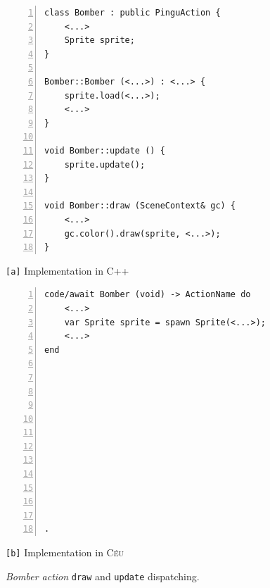 \documentclass{vgtc}                          %
\newcommand{\CEU}{\textsc{C\'{e}u}\xspace}
\newcommand{\code}[1] {{\small{\texttt{#1}}}}
\newcommand{\ax}{\code{[a]}\xspace}
\newcommand{\bx}{\code{[b]}\xspace}
\begin{document}
\begin{figure}[t]
\begin{minipage}[t]{0.50\linewidth}
\begin{lstlisting}[numbers=left,xleftmargin=3em]
class Bomber : public PinguAction {
    <...>
    Sprite sprite;
}

Bomber::Bomber (<...>) : <...> {
    sprite.load(<...>);
    <...>
}

void Bomber::update () {
    sprite.update();
}

void Bomber::draw (SceneContext& gc) {
    <...>
    gc.color().draw(sprite, <...>);
}
\end{lstlisting}
\centering\small{\ax Implementation in C++}
\end{minipage}
%
\begin{minipage}[t]{0.50\linewidth}
\begin{lstlisting}[numbers=left,xleftmargin=3em]
code/await Bomber (void) -> ActionName do
    <...>
    var Sprite sprite = spawn Sprite(<...>);
    <...>
end












.
\end{lstlisting}
\centering\small{\bx Implementation in \CEU}
\end{minipage}
\caption{ \emph{Bomber action} \code{draw} and \code{update} dispatching.
\label{lst.hier}
}
\end{figure}
\end{document}
